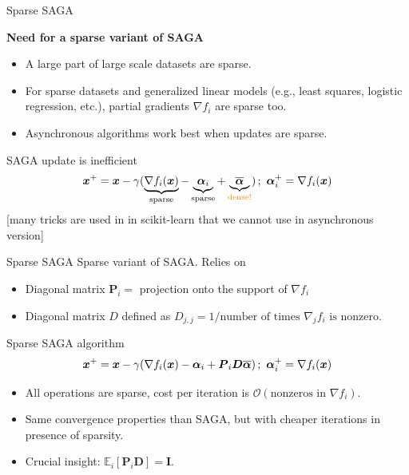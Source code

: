 \documentclass[10pt]{beamer}
\let\oldparencite=\parencite
\renewcommand{\parencite}[1]{\textcolor[rgb]{1.,.9,.9}{\oldparencite{#1}}}
\begin{document}
\begin{frame}{Sparse SAGA}

{\bfseries Need for a sparse variant of SAGA}
\begin{itemize}
\item A large part of large scale datasets are sparse.
\item For sparse datasets and generalized linear models (e.g., least squares, logistic regression, etc.), partial gradients $\nabla f_i$ are sparse too.
\item Asynchronous algorithms work best when updates are sparse.
\end{itemize}

\vspace{1em}
SAGA update is inefficient
$$
{\boldsymbol x}^+ = {\boldsymbol x} - \gamma (\underbrace{\nabla f_i({\boldsymbol x})}_{\text{sparse}} - \underbrace{{\boldsymbol \alpha}_i}_{\text{sparse}} + \underbrace{\overline{{\boldsymbol \alpha}}}_{\color{orange}\text{dense!}})\,;~{\boldsymbol \alpha}_i^+ = \nabla f_i({\boldsymbol x})
$$
[many tricks are used in in scikit-learn that we cannot use in asynchronous version]

\end{frame}



\begin{frame}{Sparse SAGA}
Sparse variant of SAGA. Relies on

\begin{itemize}
\item Diagonal matrix $\boldsymbol{P}_i = $ projection onto the support of $\nabla f_i$
\item Diagonal matrix $D$ defined as $D_{j, j} = 1 / \text{number of times $\nabla_j f_i$ is nonzero}$.
\end{itemize}

\begin{alertblock}{Sparse SAGA algorithm~\parencite{leblond2016Asaga}}
$$
{\boldsymbol x}^+ = {\boldsymbol x} - \gamma (\nabla f_i({\boldsymbol x}) - {\boldsymbol \alpha}_i + \boldsymbol{P}_i \boldsymbol{D}\overline{{\boldsymbol \alpha}})\,;~{\boldsymbol \alpha}_i^+ = \nabla f_i({\boldsymbol x})
$$
\end{alertblock}

\begin{itemize}
\item All operations are sparse, cost per iteration is $\mathcal{O}(\text{nonzeros in $\nabla f_i$})$.
\item Same convergence properties than SAGA, but with cheaper iterations in presence of sparsity.
\item Crucial insight: $\mathbb{E}_i[\boldsymbol{P}_i \boldsymbol{D}] = \boldsymbol{I}$.
\end{itemize}

\end{frame}
\end{document}
